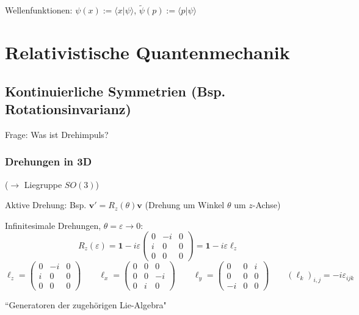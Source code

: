 \documentclass[11pt,a4paper]{report}
\begin{document}
Wellenfunktionen: $\psi (x) :=\langle x|\psi\rangle$, $\tilde{\psi}(p):=\langle p|\psi\rangle$

\chapter{Relativistische Quantenmechanik}

\newcommand{\dt}{\frac{\mathrm{d}}{\mathrm{d}t}}
\newcommand{\dif}{\mathrm{d}}
\newcommand{\vf}[1]{\mathbf{#1}}


\section{Kontinuierliche Symmetrien (Bsp. Rotationsinvarianz)}

Frage: Was ist Drehimpuls?

\subsection{Drehungen in 3D}

($\rightarrow$ Liegruppe $SO(3)$)\par 

Aktive Drehung: Bsp. $\vf{v}'=R_z(\theta )\vf{v}$ (Drehung um Winkel $\theta$ um $z$-Achse)\par 

Infinitesimale Drehungen, $\theta = \varepsilon\rightarrow 0$:
$$R_z(\varepsilon)=\mathbf{1} -i\varepsilon\begin{pmatrix}
0 & -i & 0 \\
i & 0 & 0 \\
0 & 0 & 0
\end{pmatrix} = \mathbf{1} - i\varepsilon \ell_z$$
$$\ell_z = \begin{pmatrix}
0 & -i & 0 \\
i & 0 & 0 \\
0 & 0 & 0  
\end{pmatrix}\qquad\ell_x = \begin{pmatrix}
0 & 0 & 0 \\
0 & 0 & -i \\
0 & i & 0  
\end{pmatrix}\qquad\ell_y = \begin{pmatrix}
0 & 0 & i \\
0 & 0 & 0 \\
-i & 0 & 0  
\end{pmatrix}\qquad (\ell_k)_{i,j}=-i\varepsilon_{ijk}$$

``Generatoren der zugehörigen Lie-Algebra"\par 
\end{document}
